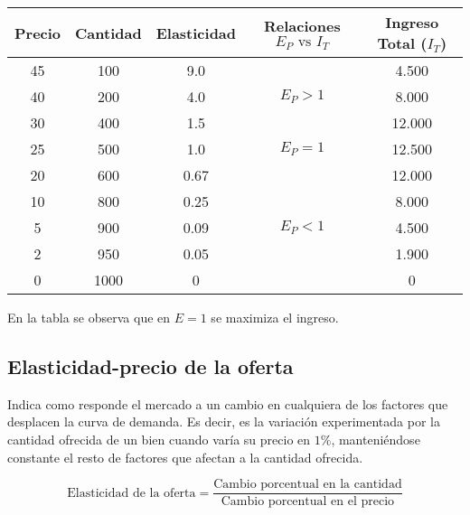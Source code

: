 \begin{table}[h!]
    \centering
    \begin{tabular}{ccccc}
        \hline
        Precio & Cantidad & Elasticidad & Relaciones \(E_P \text{ vs } I_T\) & Ingreso Total (\(I_T\)) \\
        \hline
        45     & 100      & 9.0         &                                    & 4.500                   \\
        40     & 200      & 4.0         & \(E_P > 1\)                        & 8.000                   \\
        30     & 400      & 1.5         &                                    & 12.000                  \\
        25     & 500      & 1.0         & \(E_P = 1\)                        & 12.500                  \\
        20     & 600      & 0.67        &                                    & 12.000                  \\
        10     & 800      & 0.25        &                                    & 8.000                   \\
        5      & 900      & 0.09        & \(E_P < 1\)                        & 4.500                   \\
        2      & 950      & 0.05        &                                    & 1.900                   \\
        0      & 1000     & 0           &                                    & 0                       \\
        \hline
    \end{tabular}
\end{table}

En la tabla se observa que en \(E=1\) se maximiza el ingreso.

\subsection{Elasticidad-precio de la oferta}

Indica como responde el mercado a un cambio en cualquiera de los factores 
que desplacen la curva de demanda.
Es decir,
es la variación experimentada por la cantidad ofrecida de un bien 
cuando varía su precio en \(1\%\),
manteniéndose constante el resto de factores que afectan a la cantidad ofrecida.

\begin{equation*}
    \text{Elasticidad de la oferta} = \frac{\text{Cambio porcentual en la cantidad}}{\text{Cambio porcentual en el precio}}
\end{equation*}

